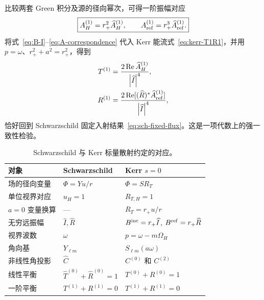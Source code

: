 \documentclass[UTF8,fontset=fandol,11pt,a4paper,oneside]{ctexart}
\numberwithin{equation}{section}
\newcommand{\Bin}{B^{\rm inc}}
\newcommand{\Bref}{B^{\rm ref}}
\newcommand{\abs}[1]{\left|#1\right|}
\newcommand{\Ree}{\operatorname{Re}}
\begin{document}
比较两套 Green 积分及源的径向幂次，可得一阶振幅对应
\begin{equation}
\boxed{
A_H^{(1)}=r_+^2\widehat A_H^{(1)},\qquad
A_{\rm ref}^{(1)}=r_+^3\widehat A_{\rm ref}^{(1)}.}
\label{eq:A-correspondence}
\end{equation}
将式~\eqref{eq:B-I}--\eqref{eq:A-correspondence} 代入 Kerr 能流式~\eqref{eq:kerr-T1R1}，并用 $p=\omega$、$r_+^2+a^2=r_+^2$，得到
\begin{align}
T^{(1)}&=\frac{2\Ree\widehat A_H^{(1)}}{\abs{\widehat I}^4},\\
R^{(1)}&=\frac{2\Ree[(\widehat R)^*\widehat A_{\rm ref}^{(1)}]}
{\abs{\widehat I}^4},
\end{align}
恰好回到 Schwarzschild 固定入射结果~\eqref{eq:sch-fixed-flux}。这是一项代数上的强一致性检验。

\begin{table}[H]
\centering
\caption{Schwarzschild 与 Kerr 标量散射约定的对应。}
\label{tab:correspondence}
\begin{tabularx}{\textwidth}{>{\raggedright\arraybackslash}p{}XX}
\toprule
对象 & Schwarzschild & Kerr $s=0$ \\
\midrule
场的径向变量 & $\Phi=Yu/r$ & $\Phi=SR_T$ \\
单位视界对应 & $u_H=1$ & $R_{T,\allowbreak H}=1$ \\
$a=0$ 变量换算 & --- & $R_T=r_+u/r$ \\
无穷远振幅 & $\widehat I,\allowbreak \widehat R$ & $\Bin=r_+\widehat I$, $\Bref=r_+\widehat R$ \\
视界波数 & $\omega$ & $p=\omega-m\Omega_H$ \\
角向基 & $Y_{\ell m}$ & $S_{\ell m}(a\omega)$ \\
非线性角投影 & $\widehat C$ & $C^{(0)}$ 和 $C^{(2)}$ \\
线性平衡 & $\widehat T^{(0)}+\widehat R^{(0)}=1$ & $T^{(0)}+R^{(0)}=1$ \\
一阶平衡 & $T^{(1)}+R^{(1)}=0$ & $T^{(1)}+R^{(1)}=0$ \\
\bottomrule
\end{tabularx}
\end{table}
\end{document}
